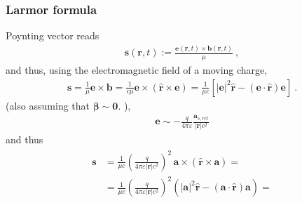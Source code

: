 \documentclass[letterpaper,10pt,english]{jupyterBook}
\begin{document}
\subsubsection{Larmor formula}
\label{\detokenize{ch/quantum-mechanics/history/larmor-formula:larmor-formula}}\label{\detokenize{ch/quantum-mechanics/history/larmor-formula:moving-charge-radiation-larmor}}
\sphinxAtStartPar
Poynting vector reads
\begin{equation*}
\begin{split}\mathbf{s}(\mathbf{r},t) := \frac{ \mathbf{e}(\mathbf{r},t) \times \mathbf{b}(\mathbf{r},t) }{\mu} \ ,\end{split}
\end{equation*}
\sphinxAtStartPar
and thus, using the electromagnetic field of a moving charge,
\begin{equation*}
\begin{split}\mathbf{s} = \frac{1}{\mu} \mathbf{e} \times \mathbf{b} = \frac{1}{c \mu} \mathbf{e} \times \left( \hat{\mathbf{r}} \times \mathbf{e} \right) = \frac{1}{\mu c} \left[ |\mathbf{e}|^2 \hat{\mathbf{r}} - ( \mathbf{e} \cdot \hat{\mathbf{r}} ) \mathbf{e} \right] \ .\end{split}
\end{equation*}
\sphinxAtStartPar
{} (also assuming that \(\boldsymbol\beta \sim \mathbf{0}\).  ),
\begin{equation*}
\begin{split}\mathbf{e} \sim - \frac{q}{4 \pi \varepsilon} \frac{\mathbf{a}_{s,ret}}{|\mathbf{r}| c^2}\end{split}
\end{equation*}
\sphinxAtStartPar
and thus
\begin{equation*}
\begin{split}\begin{aligned}
  \mathbf{s}
  & = \frac{1}{\mu c} \left( \frac{q}{4 \pi \varepsilon |\mathbf{r}| c^2} \right)^2 \, \mathbf{a} \times \left( \hat{\mathbf{r}} \times \mathbf{a} \right) = \\
  & = \frac{1}{\mu c} \left( \frac{q}{4 \pi \varepsilon |\mathbf{r}| c^2} \right)^2 \left( |\mathbf{a}|^2 \hat{\mathbf{r}} - ( \mathbf{a} \cdot \hat{\mathbf{r}} ) \mathbf{a} \right) = \\
\end{aligned}\end{split}
\end{equation*}
\end{document}
